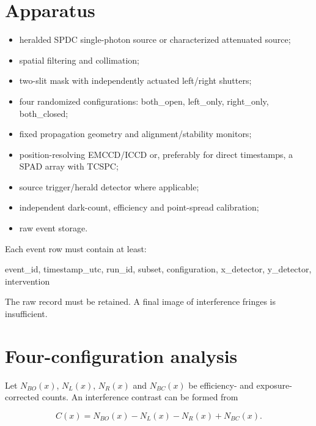 \documentclass[11pt,a4paper,openany]{report}
\begin{document}
\section{Apparatus}

\begin{itemize}
\item 
heralded SPDC single-photon source or characterized attenuated source;

\item 
spatial filtering and collimation;

\item 
two-slit mask with independently actuated left/\allowbreak{}right shutters;

\item 
four randomized configurations: both\_open, left\_only, right\_only, both\_closed;

\item 
fixed propagation geometry and alignment/\allowbreak{}stability monitors;

\item 
position-resolving EMCCD/\allowbreak{}ICCD or, preferably for direct timestamps, a SPAD array with TCSPC;

\item 
source trigger/\allowbreak{}herald detector where applicable;

\item 
independent dark-count, efficiency and point-spread calibration;

\item 
raw event storage.

\end{itemize}

Each event row must contain at least:

event\_id, timestamp\_utc, run\_id, subset, configuration, x\_detector, y\_detector, intervention

The raw record must be retained. A final image of interference fringes is insufficient.

\section{Four-configuration analysis}

Let \(N_{BO}(x)\), \(N_L(x)\), \(N_R(x)\) and \(N_{BC}(x)\) be efficiency- and exposure-corrected counts. An interference contrast can be formed from

\[
C(x)=N_{BO}(x)-N_L(x)-N_R(x)+N_{BC}(x).
\]
\end{document}
